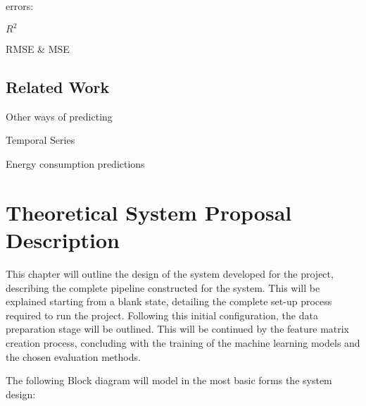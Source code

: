 \documentclass[12pt]{report} %
\begin{document}
errors:

$ R^2 $

RMSE \& MSE

\section{Related Work}
Other ways of predicting

Temporal Series

Energy consumption predictions





\chapter{Theoretical System Proposal Description}

This chapter will outline the design of the system developed for the project, describing the complete pipeline constructed for the system. This will be explained starting from a blank state, detailing the complete set-up process required to run the project. Following this initial configuration, the data preparation stage will be outlined. This will be continued by the feature matrix creation process, concluding with the training of the machine learning models and the chosen evaluation methods.

The following Block diagram will model in the most basic forms the system design:









\end{document}
